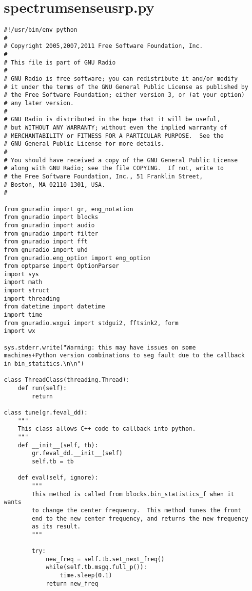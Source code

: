 \section{spectrumsenseusrp.py}
\begin{lstlisting}[breaklines]
#!/usr/bin/env python
#
# Copyright 2005,2007,2011 Free Software Foundation, Inc.
#
# This file is part of GNU Radio
#
# GNU Radio is free software; you can redistribute it and/or modify
# it under the terms of the GNU General Public License as published by
# the Free Software Foundation; either version 3, or (at your option)
# any later version.
#
# GNU Radio is distributed in the hope that it will be useful,
# but WITHOUT ANY WARRANTY; without even the implied warranty of
# MERCHANTABILITY or FITNESS FOR A PARTICULAR PURPOSE.  See the
# GNU General Public License for more details.
#
# You should have received a copy of the GNU General Public License
# along with GNU Radio; see the file COPYING.  If not, write to
# the Free Software Foundation, Inc., 51 Franklin Street,
# Boston, MA 02110-1301, USA.
#

from gnuradio import gr, eng_notation
from gnuradio import blocks
from gnuradio import audio
from gnuradio import filter
from gnuradio import fft
from gnuradio import uhd
from gnuradio.eng_option import eng_option
from optparse import OptionParser
import sys
import math
import struct
import threading
from datetime import datetime
import time
from gnuradio.wxgui import stdgui2, fftsink2, form
import wx

sys.stderr.write("Warning: this may have issues on some machines+Python version combinations to seg fault due to the callback in bin_statitics.\n\n")

class ThreadClass(threading.Thread):
    def run(self):
        return

class tune(gr.feval_dd):
    """
    This class allows C++ code to callback into python.
    """
    def __init__(self, tb):
        gr.feval_dd.__init__(self)
        self.tb = tb

    def eval(self, ignore):
        """
        This method is called from blocks.bin_statistics_f when it wants
        to change the center frequency.  This method tunes the front
        end to the new center frequency, and returns the new frequency
        as its result.
        """

        try:
            new_freq = self.tb.set_next_freq()
            while(self.tb.msgq.full_p()):
                time.sleep(0.1)
            return new_freq


\end{lstlisting}

